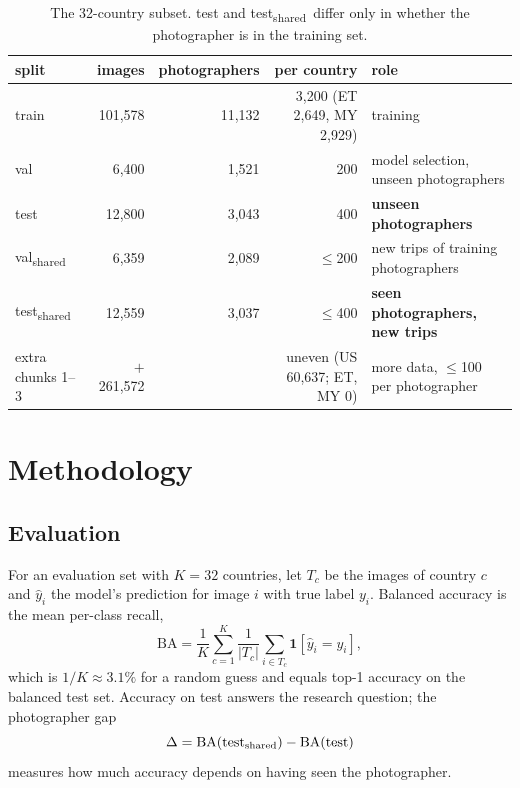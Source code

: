 \documentclass[11pt]{article}
\newcommand{\tsh}{test\textsubscript{shared}}
\newcommand{\vsh}{val\textsubscript{shared}}
\begin{document}
\begin{table}[!htbp]
\centering\small
\caption{The 32-country subset. test and \tsh\ differ only in whether the photographer is in the training set.}
\label{tab:data}
\setlength{\tabcolsep}{3.5pt}\footnotesize
\begin{tabular}{@{}lrrrl@{}}
\toprule
split & images & photographers & per country & role \\
\midrule
train & 101{,}578 & 11{,}132 & 3{,}200 (ET 2{,}649, MY 2{,}929) & training \\
val & 6{,}400 & 1{,}521 & 200 & model selection, unseen photographers \\
test & 12{,}800 & 3{,}043 & 400 & \textbf{unseen photographers} \\
\vsh & 6{,}359 & 2{,}089 & $\le$200 & new trips of training photographers \\
\tsh & 12{,}559 & 3{,}037 & $\le$400 & \textbf{seen photographers, new trips} \\
extra chunks 1--3 & $+$261{,}572 & & uneven (US 60{,}637; ET, MY 0) & more data, $\le$100 per photographer \\
\bottomrule
\end{tabular}
\end{table}

\section{Methodology}
\subsection{Evaluation}
For an evaluation set with $K=32$ countries, let $T_c$ be the images of country $c$ and $\hat y_i$ the
model's prediction for image $i$ with true label $y_i$. Balanced accuracy is the mean per-class recall,
\begin{equation}
\mathrm{BA}=\frac{1}{K}\sum_{c=1}^{K}\frac{1}{|T_c|}\sum_{i\in T_c}\mathbf{1}[\hat y_i=y_i],
\end{equation}
which is $1/K\approx3.1\%$ for a random guess and equals top-1 accuracy on the balanced test set. Accuracy on
test answers the research question; the photographer gap
\begin{equation}
\Delta=\mathrm{BA}(\text{\tsh})-\mathrm{BA}(\text{test})
\end{equation}
measures how much accuracy depends on having seen the photographer.
\end{document}
